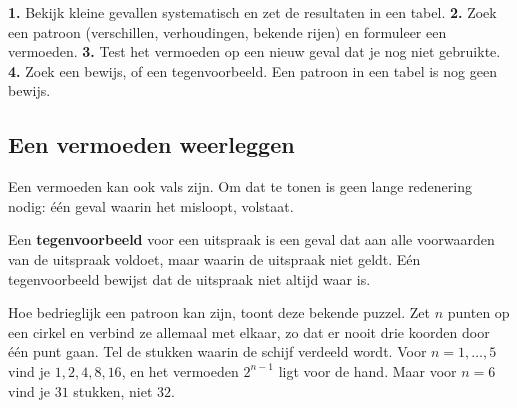\begin{werkwijze}
\textbf{1.} Bekijk kleine gevallen systematisch en zet de resultaten in een tabel. \textbf{2.} Zoek een patroon (verschillen, verhoudingen, bekende rijen) en formuleer een vermoeden. \textbf{3.} Test het vermoeden op een nieuw geval dat je nog niet gebruikte. \textbf{4.} Zoek een bewijs, of een tegenvoorbeeld. Een patroon in een tabel is nog geen bewijs.
\end{werkwijze}

\begin{oefeningen}
\end{oefeningen}

\subsection{Een vermoeden weerleggen}\label{sec:h1-weerleggen}

Een vermoeden kan ook vals zijn. Om dat te tonen is geen lange redenering nodig: één geval waarin het misloopt, volstaat.

\begin{theorie}
Een \textbf{\textcolor{accent}{tegenvoorbeeld}} voor een uitspraak is een geval dat aan alle voorwaarden van de uitspraak voldoet, maar waarin de uitspraak niet geldt. Eén tegenvoorbeeld bewijst dat de uitspraak niet altijd waar is.
\end{theorie}

Hoe bedrieglijk een patroon kan zijn, toont deze bekende puzzel. Zet $n$ punten op een cirkel en verbind ze allemaal met elkaar, zo dat er nooit drie koorden door één punt gaan. Tel de stukken waarin de schijf verdeeld wordt. Voor $n = 1, \ldots, 5$ vind je $1, 2, 4, 8, 16$, en het vermoeden $2^{n-1}$ ligt voor de hand. Maar voor $n = 6$ vind je $31$ stukken, niet $32$.


